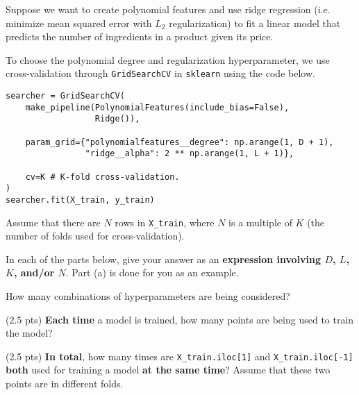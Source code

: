 \documentclass[twoside,12pt]{article}
\begin{document}
\begin{probset}
\begin{prob}[(8 pts)]
\end{prob}

\newpage

\begin{prob}[(5 pts)]

Suppose we want to create polynomial features and use ridge regression (i.e. minimize mean squared error with $L_2$ regularization) to fit a linear model that predicts the number of ingredients in a product given its price.

To choose the polynomial degree and regularization hyperparameter, we use cross-validation through \texttt{GridSearchCV} in \texttt{sklearn} using the code below.

\begin{verbatim}
searcher = GridSearchCV(
    make_pipeline(PolynomialFeatures(include_bias=False), 
                  Ridge()),
    
    param_grid={"polynomialfeatures__degree": np.arange(1, D + 1), 
                "ridge__alpha": 2 ** np.arange(1, L + 1)},

    cv=K # K-fold cross-validation.
) 
searcher.fit(X_train, y_train)
\end{verbatim}

Assume that there are $N$ rows in \texttt{X\_train}, where $N$ is a multiple of $K$ (the number of folds used for cross-validation).

In each of the parts below, give your answer as an \textbf{expression involving $D$, $L$, $K$, and/or $N$}. Part (a) is done for you as an example.

\begin{subprobset}

\begin{subprob}

How many combinations of hyperparameters are being considered?


\end{subprob}

\begin{subprob}(2.5 pts) \textbf{Each time} a model is trained, how many points are being used to train the model?

\biginlineresponsebox[2in]{}

\end{subprob}

\begin{subprob}(2.5 pts) \textbf{In total}, how many times are \texttt{X\_train.iloc[1]} and \texttt{X\_train.iloc[-1]} \textbf{both} used for training a model \textbf{at the same time}? Assume that these two points are in different folds.


\end{subprob}
\end{subprobset}
\end{prob}
\end{probset}
\end{document}
